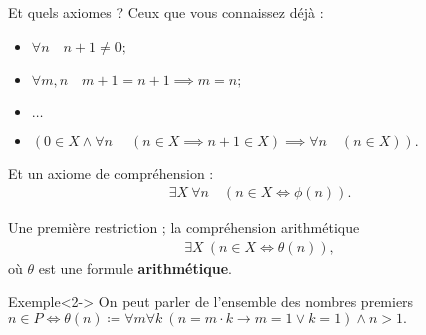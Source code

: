 \documentclass{beamer} %
\begin{document}

\begin{frame}{Et quels axiomes ?}
    Ceux que vous connaissez déjà :
    \begin{itemize}
        \item<2-> $\forall n \quad n + 1 \neq 0 ;$
        \item<3-> $\forall m,n \quad m + 1 = n + 1 \implies m = n ;$
        \item<3-> $\dots$
        \item<4-> $(0 \in X \land \forall n \quad \ (n \in X \implies n + 1 \in X) \implies \forall n \quad (n \in X)).$
    \end{itemize}
    \pause \pause \pause \pause Et un axiome de compréhension :
     \begin{align*}
        \exists X \ \forall n \quad (n \in X \Longleftrightarrow \phi(n)).
    \end{align*}

        
\end{frame}




\begin{frame}{Une première restriction ; la compréhension arithmétique }
    \begin{align*}
        \exists X \ (n \in X \Longleftrightarrow \theta(n) ),
    \end{align*}
    où $\theta$ est une formule \textbf{arithmétique}.

\begin{exampleblock}{Exemple}<2->
   On peut parler de l'ensemble des nombres premiers $n \in P \Longleftrightarrow \theta(n) \coloneqq \forall m \forall k \ (n = m\cdot k \longrightarrow m = 1 \lor k = 1) \land n > 1.$
\end{exampleblock}

\end{frame}

\end{document}
